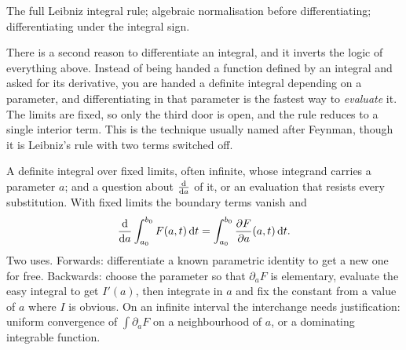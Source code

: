 \begin{seealsob}The full Leibniz integral rule; algebraic normalisation before differentiating; differentiating under the integral sign.\end{seealsob}

There is a second reason to differentiate an integral, and it inverts the logic of everything above. Instead of being handed a function defined by an integral and asked for its derivative, you are handed a definite integral depending on a parameter, and differentiating in that parameter is the fastest way to \emph{evaluate} it. The limits are fixed, so only the third door is open, and the rule reduces to a single interior term. This is the technique usually named after Feynman, though it is Leibniz's rule with two terms switched off.

\cue A definite integral over fixed limits, often infinite, whose integrand carries a parameter $a$; and a question about $\frac{\mathrm{d}}{\mathrm{d}a}$ of it, or an evaluation that resists every substitution.
\method With fixed limits the boundary terms vanish and
\[
\frac{\mathrm{d}}{\mathrm{d}a}\int_{a_{0}}^{b_{0}}F(a,t)\,\mathrm{d} t=\int_{a_{0}}^{b_{0}}\frac{\partial F}{\partial a}(a,t)\,\mathrm{d} t .
\]
Two uses. Forwards: differentiate a known parametric identity to get a new one for free. Backwards: choose the parameter so that $\partial_{a}F$ is elementary, evaluate the easy integral to get $I'(a)$, then integrate in $a$ and fix the constant from a value of $a$ where $I$ is obvious. On an infinite interval the interchange needs justification: uniform convergence of $\int\partial_{a}F$ on a neighbourhood of $a$, or a dominating integrable function.

